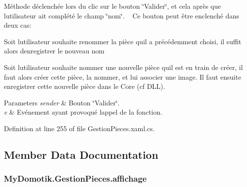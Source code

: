 Méthode déclenchée lors du clic sur le bouton \char`\"{}\+Valider\char`\"{}, et cela après que l\textquotesingle{}utilisateur ait complété le champ \char`\"{}nom\char`\"{}. ~\newline
Ce bouton peut être enclenché dans deux cas\+: ~\newline



\begin{DoxyItemize}
\item Soit l\textquotesingle{}utilisateur souhaite renommer la pièce qu\textquotesingle{}il a précédemment choisi, il suffit alors d\textquotesingle{}enregistrer le nouveau nom ~\newline

\item Soit l\textquotesingle{}utilisateur souhaite nommer une nouvelle pièce qu\textquotesingle{}il est en train de créer, il faut alors créer cette pièce, la nommer, et lui associer une image. Il faut ensuite enregistrer cette nouvelle pièce dans le Core (cf D\+LL). 
\end{DoxyItemize}


\begin{DoxyParams}{Parameters}
{\em sender} & Bouton \char`\"{}\+Valider\char`\"{}.\\
\hline
{\em e} & Evénement ayant provoqué l\textquotesingle{}appel de la fonction.\\
\hline
\end{DoxyParams}


Definition at line 255 of file Gestion\+Pieces.\+xaml.\+cs.



\subsection{Member Data Documentation}
\subsubsection[{\texorpdfstring{affichage}{affichage}}]{ My\+Domotik.\+Gestion\+Pieces.\+affichage\hspace{0.3cm}{\ttfamily [private]}}\hypertarget{class_my_domotik_1_1_gestion_pieces_a8b682065001015d7e8f9aed32eda4fd9}{}\label{class_my_domotik_1_1_gestion_pieces_a8b682065001015d7e8f9aed32eda4fd9}


